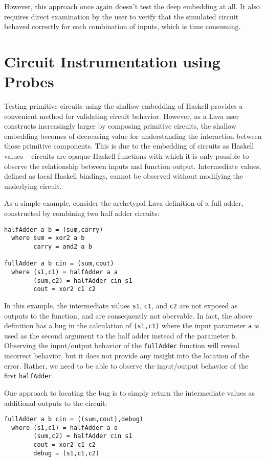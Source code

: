 \documentclass{llncs}
\begin{document}
However, this approach once again doesn't test the deep embedding at all.
It also requires direct examination by the user to verify that the
simulated circuit behaved correctly for each combination of inputs, which
is time consuming.

\section{Circuit Instrumentation using Probes}

Testing primitive circuits using the shallow embedding of Haskell provides a
convenient method for validating circuit behavior. However, as a Lava user
constructs increasingly larger by composing primitive circuits, the shallow
embedding becomes of decreasing value for understanding the interaction between
those primitive components. This is due to the embedding of circuits as Haskell
values -- circuits are opaque Haskell functions with which it is only possible
to observe the relationship between inputs and function output. Intermediate
values, defined as local Haskell bindings, cannot be observed without modifying
the underlying circuit.

As a simple example, consider the archetypal Lava definition of a full adder,
constructed by combining two half adder circuits:

\begin{verbatim}
halfAdder a b = (sum,carry)
  where sum = xor2 a b
        carry = and2 a b

fullAdder a b cin = (sum,cout)
  where (s1,c1) = halfAdder a a
        (sum,c2) = halfAdder cin s1
        cout = xor2 c1 c2
\end{verbatim}


In this example, the intermediate values \verb!s1!, \verb!c1!, and \verb!c2! are
not exposed as outputs to the function, and are consequently not
obervable. In fact, the above definition has a bug in the calculation of
\verb!(s1,c1)! where the input parameter \verb!a! is used as the second argument
to the half adder instead of the parameter \verb!b!. Observing the input/output
behavior of the \verb!fullAdder! function will reveal incorrect behavior, but it
does not provide any insight into the location of the error. Rather, we need to
be able to observe the input/output behavior of the first \verb!halfAdder!.

One approach to locating the bug is to simply return the intermediate values as
additional outputs to the circuit:

\begin{verbatim}
fullAdder a b cin = ((sum,cout),debug)
  where (s1,c1) = halfAdder a a
        (sum,c2) = halfAdder cin s1
        cout = xor2 c1 c2
        debug = (s1,c1,c2)
\end{verbatim}
\end{document}
